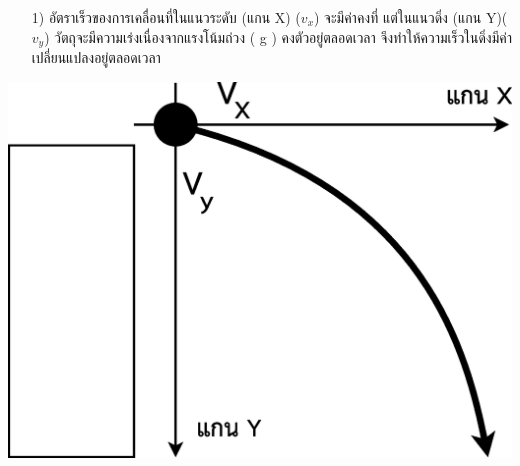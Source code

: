 \tcblower
\begin{minipage}{.6\textwidth}
	\begin{itemize}[leftmargin=*]
		\item[1)] อัตราเร็วของการเคลื่อนที่ในแนวระดับ (แกน X) ($v_x$) จะมีค่าคงที่ แต่ในแนวดิ่ง (แกน Y)($v_y$) วัตถุจะมีความเร่งเนื่องจากแรงโน้มถ่วง ( g )   คงตัวอยู่ตลอดเวลา    จึงทำให้ความเร็วในดิ่งมีค่าเปลี่ยนแปลงอยู่ตลอดเวลา
	\end{itemize}
\end{minipage}
\hfill
\begin{adjustbox}{valign=c} 
	\begin{minipage}[t]{.35\linewidth}
		\includegraphics[width=\linewidth]{content-9-1.eps}
	\end{minipage}
\end{adjustbox}

